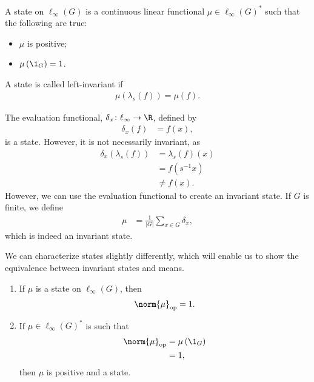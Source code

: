 \begin{definition}
  A {state} on $\ell_{\infty}\left(G\right)$ is a continuous linear functional $\mu\in \ell_{\infty}\left(G\right)^{\ast}$ such that the following are true:
  \begin{itemize}
    \item $\mu$ is positive;
    \item $\mu\left(\1_{G}\right) = 1$.
  \end{itemize}
  A state is called left-invariant if
  \begin{align*}
    \mu\left(\lambda_s\left(f\right)\right) = \mu\left(f\right).
  \end{align*}
\end{definition}
\begin{example}
  The evaluation functional, $\delta_x\colon \ell_{\infty}\rightarrow \R$, defined by
  \begin{align*}
    \delta_{x}\left(f\right) &= f(x),
  \end{align*}
  is a state. However, it is not necessarily invariant, as
  \begin{align*}
    \delta_x\left(\lambda_s\left(f\right)\right) &= \lambda_s\left(f\right)\left(x\right)\\
                                                 &= f\left(s^{-1}x\right)\\
                                                 &\neq f(x).
  \end{align*}
  However, we can use the evaluation functional to create an invariant state. If $G$ is finite, we define
  \begin{align*}
    \mu &= \frac{1}{\left\vert G \right\vert} \sum_{x\in G}\delta_x,
  \end{align*}
  which is indeed an invariant state.
\end{example}
We can characterize states slightly differently, which will enable us to show the equivalence between invariant states and means.
\begin{lemma}\label{lemma:characterizing_states}\hfill
  \begin{enumerate}[(1)]
    \item If $\mu$ is a state on $\ell_{\infty}\left(G\right)$, then
      \begin{align*}
        \norm{\mu}_{\op} = 1.
      \end{align*}
    \item If $\mu\in \ell_{\infty}\left(G\right)^{\ast}$ is such that
      \begin{align*}
        \norm{\mu}_{\op} &= \mu\left(\1_{G}\right)\\
                               &= 1,
      \end{align*}
      then $\mu$ is positive and a state.
  \end{enumerate}
\end{lemma}
